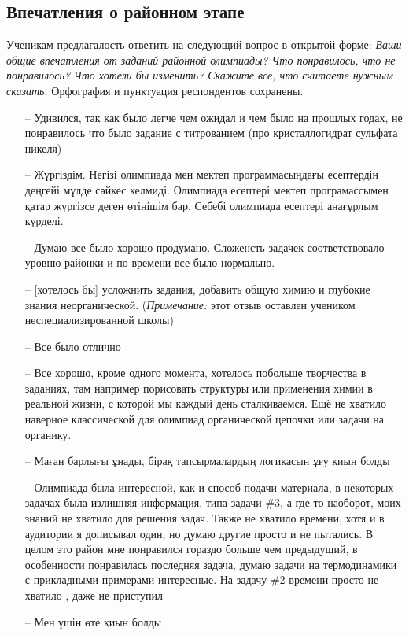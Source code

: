 \subsection{Впечатления о районном этапе}
Ученикам предлагалость ответить на следующий вопрос в открытой форме: \textit{Ваши общие впечатления от заданий районной олимпиады? Что понравилось, что не понравилось? Что хотели бы изменить? Скажите все, что считаете нужным сказать.} Орфография и пунктуация респондентов сохранены.

\begin{itemize}
    \itemsep-0.2em
    \item[--] Удивился, так как было легче чем ожидал и чем было на прошлых годах, не понравилось что было задание с титрованием (про кристаллогидрат сульфата никеля)
    \item[--] Жүргіздім. Негізі олимпиада мен мектеп программасыңдағы есептердің деңгейі мүлде сәйкес келмиді. Олимпиада есептері мектеп програмассымен қатар жүргізсе деген өтінішім бар. Себебі олимпиада есептері анағұрлым күрделі.
    \item[--] Думаю все было хорошо продумано. Сложенсть задачек соответствовало уровню районки и по времени все было нормально.
    \item[--] [хотелось бы] усложнить задания, добавить общую химию и глубокие знания неорганической. (\textit{Примечание:} этот отзыв оставлен учеником неспециализированной школы)
    \item[--] Все было отлично
    \item[--] Все хорошо, кроме одного момента, хотелось побольше творчества в заданиях, там например порисовать структуры или применения химии в реальной жизни, с которой мы каждый день сталкиваемся. Ещё не хватило наверное классической для олимпиад органической цепочки или задачи на органику.  
    \item[--] Маған барлығы ұнады, бірақ тапсырмалардың логикасын ұғу қиын болды
    \item[--] Олимпиада была интересной, как и способ подачи материала, в некоторых задачах была излишняя информация, типа задачи \#3, а где-то наоборот, моих знаний не хватило для решения задач. Также не хватило времени, хотя и в аудитории я дописывал один, но думаю другие просто и не пытались. В целом это район мне понравился гораздо больше чем предыдущий, в особенности понравилась последняя задача, думаю задачи на термодинамики с прикладными примерами интересные. \*На задачу \#2 времени просто не хватило , даже не приступил
    \item[--] Мен үшін өте қиын болды

\end{itemize}
